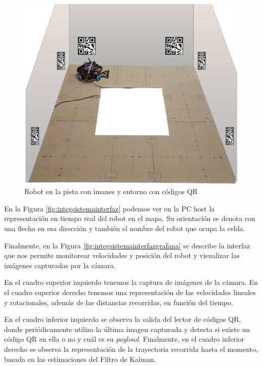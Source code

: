 \begin{figure}[H]
    \centering
    \includegraphics[width=0.8\linewidth]{images/integ_sistema_robot_en_plano.png}
    \caption{Robot en la pista con imanes y entorno con códigos QR}
    \label{fig:integsistemarobotpistaqr}
\end{figure}

En la Figura \ref{fig:integsistemainterfaz} podemos ver en la PC host la representación en tiempo real del robot en el mapa. Su orientación se denota con una flecha en esa dirección y también el nombre del robot que ocupa la celda.

Finalmente, en la Figura \ref{fig:integsistemainterfazgrafana} se describe la interfaz que nos permite monitorear velocidades y posición del robot y visualizar las imágenes capturadas por la cámara.

En el cuadro superior izquierdo tenemos la captura de imágenes de la cámara. En el cuadro superior derecho tenemos una representación de las velocidades lineales y rotacionales, además de las distancias recorridas, en función del tiempo.

En el cuadro inferior izquierdo se observa la salida del lector de códigos QR, donde periódicamente utiliza la última imagen capturada y detecta si existe un código QR en ella o no y cuál es su \textit{payload}. Finalmente, en el cuadro inferior derecho se observa la representación de la trayectoria recorrida hasta el momento, basada en las estimaciones del Filtro de Kalman.

